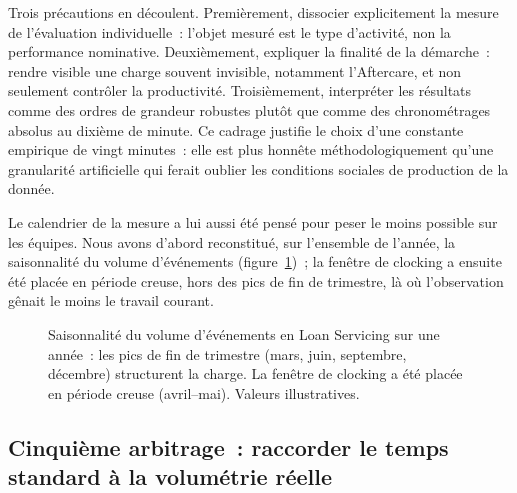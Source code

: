 Trois précautions en découlent. Premièrement, dissocier explicitement la mesure de l'évaluation individuelle~: l'objet mesuré est le type d'activité, non la performance nominative. Deuxièmement, expliquer la finalité de la démarche~: rendre visible une charge souvent invisible, notamment l'Aftercare, et non seulement contrôler la productivité. Troisièmement, interpréter les résultats comme des ordres de grandeur robustes plutôt que comme des chronométrages absolus au dixième de minute. Ce cadrage justifie le choix d'une constante empirique de vingt minutes~: elle est plus honnête méthodologiquement qu'une granularité artificielle qui ferait oublier les conditions sociales de production de la donnée.

Le calendrier de la mesure a lui aussi été pensé pour peser le moins possible sur
les équipes. Nous avons d'abord reconstitué, sur l'ensemble de l'année, la
saisonnalité du volume d'événements (figure~\ref{fig:saisonnalite})~; la fenêtre de
clocking a ensuite été placée en période creuse, hors des pics de fin de trimestre,
là où l'observation gênait le moins le travail courant.

\begin{figure}[H]\centering
{}
\caption{Saisonnalité du volume d'événements en Loan Servicing sur une année~: les pics de fin de trimestre (mars, juin, septembre, décembre) structurent la charge. La fenêtre de clocking a été placée en période creuse (avril--mai). Valeurs illustratives.}
\label{fig:saisonnalite}
\end{figure}



\subsection{Cinquième arbitrage~: raccorder le temps standard à la volumétrie réelle}
\label{sec:arbitrage-volumetrie}

